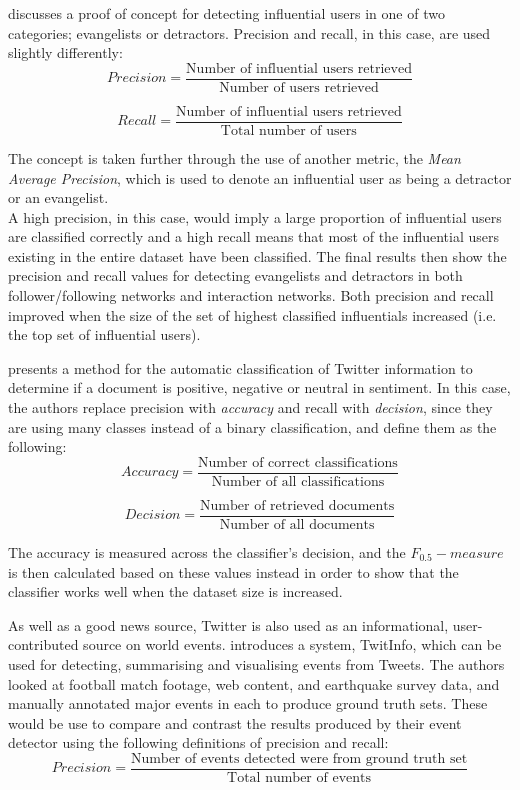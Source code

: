 \cite{bigonha10} discusses a proof of concept for detecting influential users in one of two categories; evangelists or detractors. Precision and recall, in this case, are used slightly differently:
\[	
	Precision = \frac{\text{Number of influential users retrieved}}{\text{Number of users retrieved}}
\]

\[
	Recall = \frac{\text{Number of influential users retrieved}}{\text{Total number of users}}
\]

The concept is taken further through the use of another metric, the \emph{Mean Average Precision}, which is used to denote an influential user as being a detractor or an evangelist. \\
A high precision, in this case, would imply a large proportion of influential users are classified correctly and a high recall means that most of the influential users existing in the entire dataset have been classified. The final results then show the precision and recall values for detecting evangelists and detractors in both follower/following networks and interaction networks. Both precision and recall improved when the size of the set of highest classified influentials increased (i.e. the top set of influential users).

\cite{pak10} presents a method for the automatic classification of Twitter information to determine if a document is positive, negative or neutral in sentiment. In this case, the authors replace precision with \emph{accuracy} and recall with \emph{decision}, since they are using many classes instead of a binary classification, and define them as the following:
\[	
	Accuracy = \frac{\text{Number of correct classifications}}{\text{Number of all classifications}}
\]

\[
	Decision = \frac{\text{Number of retrieved documents}}{\text{Number of all documents}}
\]

The accuracy is measured across the classifier's decision, and the $ F_{0.5}-measure $  is then calculated based on these values instead in order to show that the classifier works well when the dataset size is increased.

As well as a good news source, Twitter is also used as an informational, user-contributed source on world events. \cite{marcus11}  introduces a system, TwitInfo, which can be used for detecting, summarising and visualising events from Tweets. The authors looked at football match footage, web content, and earthquake survey data, and manually annotated major events in each to produce ground truth sets. These would be use to compare and contrast the results produced by their event detector using the following definitions of precision and recall:
\[	
	Precision = \frac{\text{Number of events detected were from ground truth set}}{\text{Total number of events}}
\]

